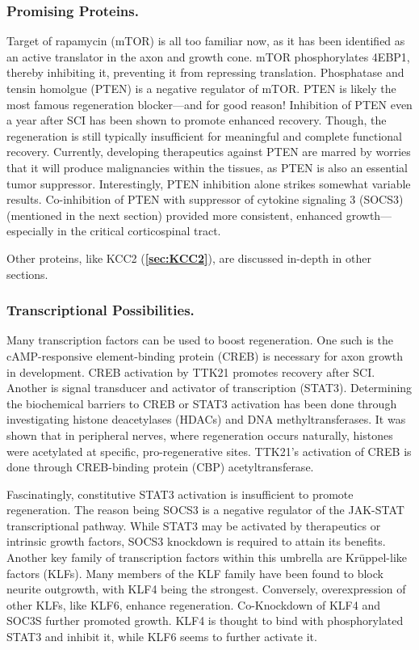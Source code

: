 \documentclass[12pt]{report}
\begin{document}
\subsubsection{Promising Proteins.}

Target of rapamycin (mTOR) is all too familiar now, as it has been identified as an active translator in the axon and growth cone. mTOR phosphorylates 4EBP1, thereby inhibiting it, preventing it from repressing translation. Phosphatase and tensin homolgue (PTEN) is a negative regulator of mTOR. PTEN is likely the most famous regeneration blocker---and for good reason! Inhibition of PTEN even a year after SCI has been shown to promote enhanced recovery. Though, the regeneration is still typically insufficient for meaningful and complete functional recovery. Currently, developing therapeutics against PTEN are marred by worries that it will produce malignancies within the tissues, as PTEN is also an essential tumor suppressor. Interestingly, PTEN inhibition alone strikes somewhat variable results. Co-inhibition of PTEN with suppressor of cytokine signaling 3 (SOCS3) (mentioned in the next section) provided more consistent, enhanced growth---especially in the critical corticospinal tract.\newline 

Other proteins, like KCC2 (\textbf{\ref{sec:KCC2}}), are discussed in-depth in other sections. 

\subsubsection{Transcriptional Possibilities.}

Many transcription factors can be used to boost regeneration. One such is the cAMP-responsive element-binding protein (CREB) is necessary for axon growth in development. CREB activation by TTK21 promotes recovery after SCI. Another is signal transducer and activator of transcription (STAT3). Determining the biochemical barriers to CREB or STAT3 activation has been done through investigating histone deacetylases (HDACs) and DNA methyltransferases. It was shown that in peripheral nerves, where regeneration occurs naturally, histones were acetylated at specific, pro-regenerative sites. TTK21's activation of CREB is done through CREB-binding protein (CBP) acetyltransferase.\newline

Fascinatingly, constitutive STAT3 activation is insufficient to promote regeneration. The reason being SOCS3 is a negative regulator of the JAK-STAT transcriptional pathway. While STAT3 may be activated by therapeutics or intrinsic growth factors, SOCS3 knockdown is required to attain its benefits. Another key family of transcription factors within this umbrella are Kr\"{u}ppel-like factors (KLFs). Many members of the KLF family have been found to block neurite outgrowth, with KLF4 being the strongest. Conversely, overexpression of other KLFs, like KLF6, enhance regeneration. Co-Knockdown of KLF4 and SOC3S further promoted growth. KLF4 is thought to bind with phosphorylated STAT3 and inhibit it, while KLF6 seems to further activate it.\newline
\end{document}
